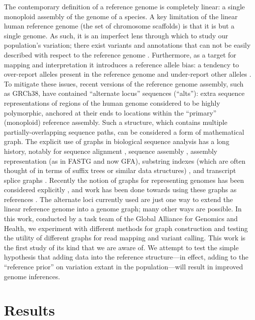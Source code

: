 The contemporary definition of a reference genome is completely linear:
a single monoploid assembly of the genome of a species. A key limitation
of the linear human reference genome (the set of chromosome scaffolds)
is that it is but a single genome. As such, it is an imperfect lens
through which to study our population's variation; there exist variants
and annotations that can not be easily described with respect to the
reference genome \cite{horton2008variation,Pei2012-xo}. Furthermore, as a
target for mapping and interpretation it introduces a reference allele
bias: a tendency to over-report alleles present in the reference genome
and under-report other alleles \cite{Degner2009-st,Brandt2015-og}. To
mitigate these issues, recent versions of the reference genome assembly,
such as GRCh38, have contained ``alternate locus'' sequences (``alts''):
extra sequence representations of regions of the human genome considered
to be highly polymorphic, anchored at their ends to locations within the
``primary'' (monoploid) reference assembly. Such a structure, which
contains multiple partially-overlapping sequence paths, can be
considered a form of mathematical graph. The explicit use of graphs in
biological sequence analysis has a long history, notably for sequence
alignment \cite{Paten2014-ga}, sequence assembly
\cite{Pevzner2001-lm,Myers2005-oi}, assembly representation (as in FASTG
and now GFA)\cite{fastg2016fastg,GFA-spec_contributors_undated-tg},
substring indexes (which are often thought of in terms of suffix trees
or similar data structures) \cite{Li2009-tj,Simpson2010-of}, and
transcript splice graphs \cite{Heber2002-pw}. Recently the notion of
graphs for representing genomes has been considered explicitly
\cite{dilthey2015improved,Paten2014-ga,maciuca2016natural}, and work has been
done towards using these graphs as references \cite{Limasset2016-by}.
The alternate loci currently used are just one way to extend the linear
reference genome into a genome graph; many other ways are possible. In
this work, conducted by a task team of the Global Alliance for Genomics
and Health, we experiment with different methods for graph construction
and testing the utility of different graphs for read mapping and variant
calling. This work is the first study of its kind that we are aware of.
We attempt to test the simple hypothesis that adding data into the
reference structure---in effect, adding to the ``reference prior'' on
variation extant in the population---will result in improved genome
inferences.

\section{Results}

